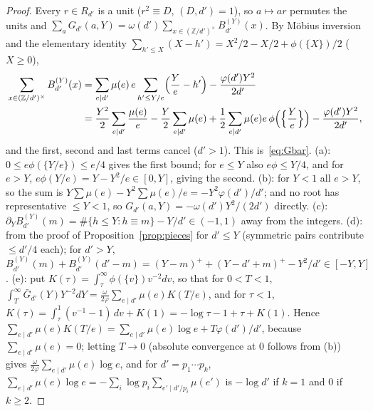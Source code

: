 \documentclass[11pt,a4paper]{article}
\theoremstyle{remark}\newtheorem{remark}[theorem]{Remark}
\newcommand{\Z}{\mathbb{Z}}\newcommand{\Q}{\mathbb{Q}}\newcommand{\F}{\mathbb{F}}\newcommand{\R}{\mathbb{R}}
\begin{document}
\begin{proof}
Every $r\in R_{d'}$ is a unit ($r^2\equiv D$, $(D,d')=1$), so $a\mapsto ar$ permutes the units and
$\sum_aG_{d'}(a,Y)=\omega(d')\sum_{x\in(\Z/d')^\times}B^{(Y)}_{d'}(x)$. By M\"obius inversion and the elementary identity
$\sum_{h'\le X}(X-h')=X^2/2-X/2+\phi(\{X\})/2$ ($X\ge0$),
\[
\begin{aligned}
\sum_{x\in(\Z/d')^\times}B^{(Y)}_{d'}(x)&=\sum_{e\mid d'}\mu(e)\,e\sum_{h'\le Y/e}\Bigl(\frac Ye-h'\Bigr)-\frac{\varphi(d')Y^2}{2d'}
\\
&=\frac{Y^2}2\sum_{e\mid d'}\frac{\mu(e)}e-\frac Y2\sum_{e\mid d'}\mu(e)+\frac12\sum_{e\mid d'}\mu(e)e\,\phi\Bigl(\Bigl\{\frac Ye\Bigr\}\Bigr)-\frac{\varphi(d')Y^2}{2d'},
\end{aligned}
\]
and the first, second and last terms cancel ($d'>1$). This is~\eqref{eq:Gbar}. (a): $0\le e\phi(\{Y/e\})\le e/4$
gives the first bound; for $e\le Y$ also $e\phi\le Y/4$, and for $e>Y$, $e\phi(Y/e)=Y-Y^2/e\in[0,Y]$, giving the
second. (b): for $Y<1$ all $e>Y$, so the sum is $Y\sum\mu(e)-Y^2\sum\mu(e)/e=-Y^2\varphi(d')/d'$; and no root has
representative $\le Y<1$, so $G_{d'}(a,Y)=-\omega(d')Y^2/(2d')$ directly. (c): $\partial_YB^{(Y)}_{d'}(m)=\#\{h\le Y:h\equiv m\}-Y/d'\in(-1,1)$
away from the integers. (d): from the proof of Proposition~\ref{prop:pieces} for $d'\le Y$ (symmetric pairs
contribute $\le d'/4$ each); for $d'>Y$, $B^{(Y)}_{d'}(m)+B^{(Y)}_{d'}(d'-m)=(Y-m)^++(Y-d'+m)^+-Y^2/d'\in[-Y,Y]$.
(e): put $K(\tau)=\int_\tau^\infty\phi(\{v\})v^{-2}dv$, so that for $0<T<1$,
$\int_T^\infty\bar G_{d'}(Y)Y^{-2}dY=\frac{\omega}{2\varphi}\sum_{e\mid d'}\mu(e)K(T/e)$, and for $\tau<1$,
$K(\tau)=\int_\tau^1(v^{-1}-1)\,dv+K(1)=-\log\tau-1+\tau+K(1)$. Hence
$\sum_{e\mid d'}\mu(e)K(T/e)=\sum_{e\mid d'}\mu(e)\log e+T\varphi(d')/d'$, because $\sum_{e\mid d'}\mu(e)=0$; letting $T\to0$
(absolute convergence at $0$ follows from (b)) gives $\frac{\omega}{2\varphi}\sum_{e\mid d'}\mu(e)\log e$, and for
$d'=p_1\cdots p_k$, $\sum_{e\mid d'}\mu(e)\log e=-\sum_i\log p_i\sum_{e'\mid d'/p_i}\mu(e')$ is $-\log d'$ if $k=1$ and $0$ if $k\ge2$.
\end{proof}
\end{document}
